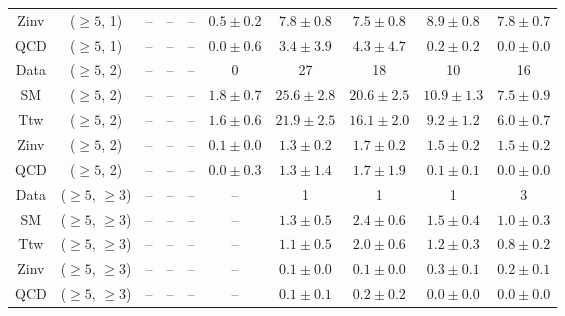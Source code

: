 \begin{table}[h!]
{\begin{tabular}{cccccccccc}
	Zinv & ($\ge5$, 1) & -- & -- & -- & $0.5\pm 0.2$ & $7.8\pm 0.8$ & $7.5\pm 0.8$ & $8.9\pm 0.8$ & $7.8\pm 0.7$ \\[0.5ex] 
	QCD & ($\ge5$, 1) & -- & -- & -- & $0.0\pm 0.6$ & $3.4\pm 3.9$ & $4.3\pm 4.7$ & $0.2\pm 0.2$ & $0.0\pm 0.0$ \\[0.5ex] 
	Data & ($\ge5$, 2) & -- & -- & -- & 0 & 27 & 18 & 10 & 16 \\[0.5ex] 
	SM & ($\ge5$, 2) & -- & -- & -- & $1.8\pm 0.7$ & $25.6\pm 2.8$ & $20.6\pm 2.5$ & $10.9\pm 1.3$ & $7.5\pm 0.9$ \\[0.5ex] 
	Ttw & ($\ge5$, 2) & -- & -- & -- & $1.6\pm 0.6$ & $21.9\pm 2.5$ & $16.1\pm 2.0$ & $9.2\pm 1.2$ & $6.0\pm 0.7$ \\[0.5ex] 
	Zinv & ($\ge5$, 2) & -- & -- & -- & $0.1\pm 0.0$ & $1.3\pm 0.2$ & $1.7\pm 0.2$ & $1.5\pm 0.2$ & $1.5\pm 0.2$ \\[0.5ex] 
	QCD & ($\ge5$, 2) & -- & -- & -- & $0.0\pm 0.3$ & $1.3\pm 1.4$ & $1.7\pm 1.9$ & $0.1\pm 0.1$ & $0.0\pm 0.0$ \\[0.5ex] 
	Data & ($\ge5$, $\ge3$) & -- & -- & -- & -- & 1 & 1 & 1 & 3 \\[0.5ex] 
	SM & ($\ge5$, $\ge3$) & -- & -- & -- & -- & $1.3\pm 0.5$ & $2.4\pm 0.6$ & $1.5\pm 0.4$ & $1.0\pm 0.3$ \\[0.5ex] 
	Ttw & ($\ge5$, $\ge3$) & -- & -- & -- & -- & $1.1\pm 0.5$ & $2.0\pm 0.6$ & $1.2\pm 0.3$ & $0.8\pm 0.2$ \\[0.5ex] 
	Zinv & ($\ge5$, $\ge3$) & -- & -- & -- & -- & $0.1\pm 0.0$ & $0.1\pm 0.0$ & $0.3\pm 0.1$ & $0.2\pm 0.1$ \\[0.5ex] 
	QCD & ($\ge5$, $\ge3$) & -- & -- & -- & -- & $0.1\pm 0.1$ & $0.2\pm 0.2$ & $0.0\pm 0.0$ & $0.0\pm 0.0$ \\[0.5ex] 
	\hline
	\hline
\end{tabular}}
\end{table}

